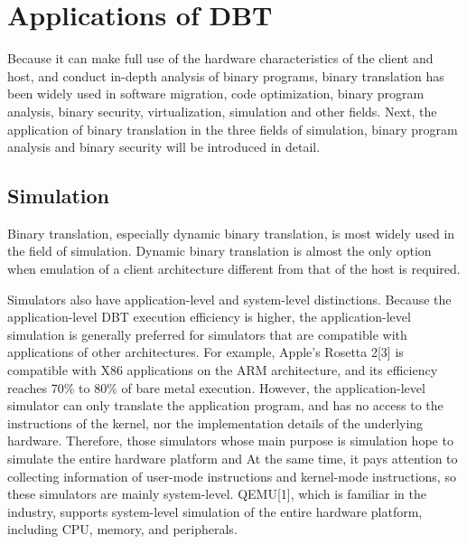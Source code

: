 \section{Applications of DBT}
\label{sec:applications}

Because it can make full use of the hardware characteristics of the client and host, and conduct in-depth analysis of binary programs, binary translation has been widely used in software migration, code optimization, binary program analysis, binary security, virtualization, simulation and other fields.
Next, the application of binary translation in the three fields of simulation, binary program analysis and binary security will be introduced in detail.

\subsection{Simulation}
Binary translation, especially dynamic binary translation, is most widely used in the field of simulation.
Dynamic binary translation is almost the only option when emulation of a client architecture different from that of the host is required.

Simulators also have application-level and system-level distinctions.
Because the application-level DBT execution efficiency is higher, the application-level simulation is generally preferred for simulators that are compatible with applications of other architectures.
For example, Apple's Rosetta 2[3] is compatible with X86 applications on the ARM architecture, and its efficiency reaches 70\% to 80\% of bare metal execution.
However, the application-level simulator can only translate the application program, and has no access to the instructions of the kernel, nor the implementation details of the underlying hardware.
Therefore, those simulators whose main purpose is simulation hope to simulate the entire hardware platform and At the same time, it pays attention to collecting information of user-mode instructions and kernel-mode instructions, so these simulators are mainly system-level.
QEMU[1], which is familiar in the industry, supports system-level simulation of the entire hardware platform, including CPU, memory, and peripherals.

